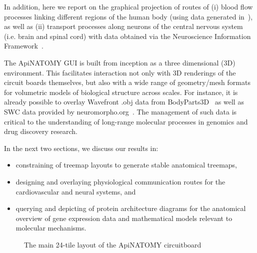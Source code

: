 In addition, here we report on the graphical projection of routes of (i) blood flow processes linking different regions of the human body (using data generated in~\cite{deB11}), as well as (ii) transport processes along neurons of the central nervous system (i.e. brain and spinal cord) with data obtained via the Neuroscience Information Framework~\cite{Gar+08}. 

The ApiNATOMY GUI is built from inception as a three dimensional (3D) environment. This facilitates interaction not only with 3D renderings of the circuit boards themselves, but also with a wide range of geometry/mesh formats for volumetric models of biological structure across scales. For instance, it is already possible to overlay Wavefront .obj data from BodyParts3D~\cite{MFT+09} as well as SWC data provided by neuromorpho.org~\cite{Asc06}. The management of such data is critical to the understanding of long-range molecular processes in genomics and drug discovery research.

In the next two sections, we discuss our results in:
\begin{itemize}
  \item constraining of treemap layouts to generate stable anatomical treemaps,
  \item designing and overlaying physiological communication routes for the cardiovascular and neural systems, and
  \item querying and depicting of protein architecture diagrams for the anatomical overview of gene expression data and mathematical models relevant to molecular mechanisms.
\end{itemize}

\begin{figure}%
	\centering%
	\begin{minipage}[b]{.52\linewidth}
		\centering%
	\end{minipage}\hskip4mm
	\begin{minipage}[b]{.44\linewidth}
		\centering%
	\end{minipage}\vskip2mm
	\caption{The main 24-tile layout of the ApiNATOMY circuitboard}
	\label{fig:treemaps}
\end{figure}


